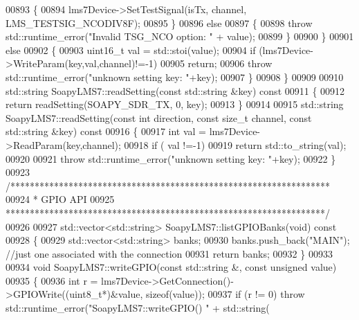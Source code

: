 \begin{DoxyCode}
{{{{{{{{{{{{{{{{{00893         \{
00894             lms7Device->SetTestSignal(isTx, channel, LMS_TESTSIG_NCODIV8F);
00895         \}
00896         \textcolor{keywordflow}{else}
00897         \{
00898             \textcolor{keywordflow}{throw} std::runtime\_error(\textcolor{stringliteral}{"Invalid TSG\_NCO option: "} + value);
00899         \}
00900     \}
00901     \textcolor{keywordflow}{else}
00902     \{
00903         uint16\_t val = std::stoi(value);
00904         \textcolor{keywordflow}{if} (lms7Device->WriteParam(key,val,channel)!=-1)
00905             \textcolor{keywordflow}{return};
00906         \textcolor{keywordflow}{throw} std::runtime\_error(\textcolor{stringliteral}{"unknown setting key: "}+key);
00907     \}
00908 \}
00909 
00910 std::string SoapyLMS7::readSetting(\textcolor{keyword}{const} std::string &key)\textcolor{keyword}{ const}
00911 \textcolor{keyword}{}\{
00912     \textcolor{keywordflow}{return} readSetting(SOAPY_SDR_TX, 0, key);
00913 \}
00914 
00915 std::string SoapyLMS7::readSetting(\textcolor{keyword}{const} \textcolor{keywordtype}{int} direction, \textcolor{keyword}{const} \textcolor{keywordtype}{size\_t} channel, \textcolor{keyword}{const} 
      std::string &key)\textcolor{keyword}{ const}
00916 \textcolor{keyword}{}\{
00917     \textcolor{keywordtype}{int} val = lms7Device->ReadParam(key,channel);
00918     \textcolor{keywordflow}{if} ( val !=-1)
00919         \textcolor{keywordflow}{return} std::to\_string(val);
00920 
00921     \textcolor{keywordflow}{throw} std::runtime\_error(\textcolor{stringliteral}{"unknown setting key: "}+key);
00922 \}
00923 \textcolor{comment}{/******************************************************************}
00924 \textcolor{comment}{ * GPIO API}
00925 \textcolor{comment}{ ******************************************************************/}
00926 
00927 std::vector<std::string> SoapyLMS7::listGPIOBanks(\textcolor{keywordtype}{void})\textcolor{keyword}{ const}
00928 \textcolor{keyword}{}\{
00929     std::vector<std::string> banks;
00930     banks.push\_back(\textcolor{stringliteral}{"MAIN"}); \textcolor{comment}{//just one associated with the connection}
00931     \textcolor{keywordflow}{return} banks;
00932 \}
00933 
00934 \textcolor{keywordtype}{void} SoapyLMS7::writeGPIO(\textcolor{keyword}{const} std::string &, \textcolor{keyword}{const} \textcolor{keywordtype}{unsigned} value)
00935 \{
00936     \textcolor{keywordtype}{int} r = lms7Device->GetConnection()->GPIOWrite((uint8\_t*)&value, \textcolor{keyword}{sizeof}(value));
00937     \textcolor{keywordflow}{if} (r != 0) \textcolor{keywordflow}{throw} std::runtime\_error(\textcolor{stringliteral}{"SoapyLMS7::writeGPIO() "} + std::string(
}}}}}}}}}}}}}}}}}
\end{DoxyCode}
